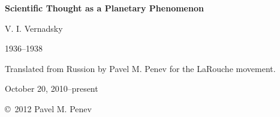 \begin{titlepage}

\begin{center}
\Huge\textbf{Scientific Thought as a Planetary Phenomenon}


\bigskip
\LARGE{V. I. Vernadsky}

\Large{1936--1938}


\bigskip
\Large{Translated from Russion by Pavel M. Penev for the LaRouche movement.}
\foreignlanguage{russian}{\nocite{vernadsky2001thought}}

October 20, 2010--present

\vfill

\copyright\ 2012 Pavel M. Penev

\end{center}

\end{titlepage}
